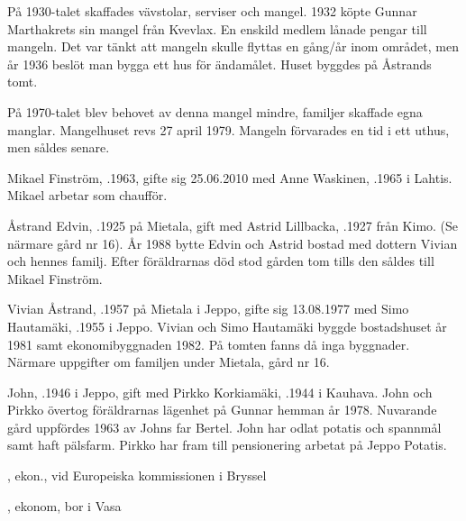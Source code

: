 På 1930-talet skaffades vävstolar, serviser och mangel. 1932 köpte Gunnar Marthakrets sin mangel från Kvevlax. En enskild medlem lånade pengar till mangeln. Det var tänkt att mangeln skulle flyttas en gång/år inom området, men år 1936 beslöt man bygga ett hus för ändamålet. Huset byggdes på Åstrands tomt.

På 1970-talet blev behovet av denna mangel mindre, familjer skaffade egna manglar. Mangelhuset revs 27 april 1979. Mangeln förvarades en tid i ett uthus, men såldes senare.






Mikael Finström, .1963, gifte sig 25.06.2010 med Anne Waskinen, .1965 i Lahtis. Mikael arbetar som chaufför.\jhvspace{}


Åstrand Edvin, .1925 på Mietala, gift med Astrid Lillbacka, .1927 från Kimo. (Se närmare gård nr 16). År 1988 bytte Edvin och Astrid bostad med dottern Vivian och hennes familj. Efter föräldrarnas död stod gården tom tills den såldes till Mikael Finström.


Vivian Åstrand, .1957  på Mietala i Jeppo, gifte sig 13.08.1977 med Simo Hautamäki, .1955 i Jeppo. Vivian och Simo Hautamäki byggde bostadshuset år 1981 samt ekonomibyggnaden 1982. På tomten fanns då inga byggnader. Närmare uppgifter om familjen under Mietala, gård nr 16.






John, .1946 i Jeppo, gift med Pirkko Korkiamäki, .1944 i Kauhava. John och Pirkko övertog föräldrarnas lägenhet på Gunnar hemman år 1978. Nuvarande gård uppfördes 1963 av Johns far Bertel. John har odlat potatis och spannmål samt haft pälsfarm. Pirkko har fram till pensionering arbetat på Jeppo Potatis.
\begin{jhchildren}
  \item {}, ekon., vid Europeiska kommissionen i Bryssel
  \item {}, ekonom, bor i Vasa
\end{jhchildren}


